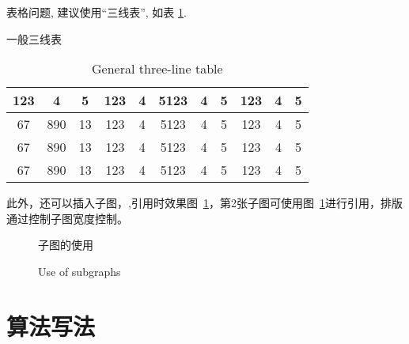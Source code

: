 \documentclass[smd,entitle,forlib,AutoFakeBold]{NJTECHMaster}
\begin{document}
表格问题, 建议使用``三线表'', 如表 \ref{tab:1}.

\begin{table}[ht]
	\centering
	\caption{一般三线表}
	\addtocounter{table}{-1}
	\renewcommand{\tablename}{Table}
	\caption{General three-line table}
	\renewcommand{\tablename}{表}
	\vspace{2pt}
	\label{tab:1}
	\begin{tabular}{c c c c c c c c c c c}
		\hline
		123 & 4  & 5  & 123 & 4 & 5123 & 4 & 5 & 123 & 4 & 5\\
		\hline
		67 & 890 & 13 & 123 & 4 & 5123 & 4 & 5 & 123 & 4 & 5\\
		67 & 890 & 13 & 123 & 4 & 5123 & 4 & 5 & 123 & 4 & 5\\
		67 & 890 & 13 & 123 & 4 & 5123 & 4 & 5 & 123 & 4 & 5\\
		\hline
	\end{tabular}
\end{table}

此外，还可以插入子图，,引用时效果图~\ref{fig-subfigure}，第2张子图可使用图~\ref{fig-subfigure}进行引用，排版通过控制子图宽度控制。

\begin{figure}[H]
	\centering
	\subfigure{\label{fig-subfigure1}}\addtocounter{subfigure}{-2}
	\quad
	\subfigure{\label{fig-subfigure2}}\addtocounter{subfigure}{-2}
	\subfigure{\label{fig-subfigure3}}\addtocounter{subfigure}{-2}
	\subfigure{\label{fig-subfigure4}}\addtocounter{subfigure}{-2}
	\caption{子图的使用}
	\addtocounter{figure}{-1}
	\renewcommand{\figurename}{Figure}
	\caption{Use of subgraphs}
	\renewcommand{\figurename}{图}
	\label{fig-subfigure}
\end{figure}

\section{算法写法}
\end{document}

